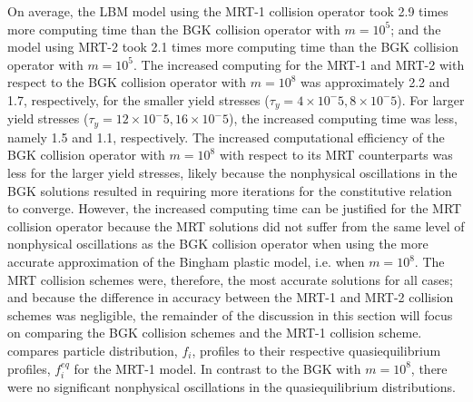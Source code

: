 On average, the LBM model using the MRT-1 collision operator took 2.9 times more computing time than the BGK collision operator with $m = 10^5$; and the model using MRT-2 took 2.1 times more computing time than the BGK collision operator with $m = 10^5$.
The increased computing for the MRT-1 and MRT-2 with respect to the BGK collision operator with $m = 10^8$ was approximately 2.2 and 1.7, respectively, for the smaller yield stresses ($\tau_y = 4 \times 10^-5, 8 \times 10^-5$).
For larger yield stresses ($\tau_y = 12 \times 10^-5, 16 \times 10^-5$), the increased computing time was less, namely 1.5 and 1.1, respectively.
The increased computational efficiency of the BGK collision operator with $m = 10^8$ with respect to its MRT counterparts was less for the larger yield stresses, likely because the nonphysical oscillations in the BGK solutions resulted in requiring more iterations for the constitutive relation to converge.
However, the increased computing time can be justified for the MRT collision operator because the MRT solutions did not suffer from the same level of nonphysical oscillations as the BGK collision operator when using the more accurate approximation of the Bingham plastic model, i.e. when $m = 10^8$. 
The MRT collision schemes were, therefore, the most accurate solutions for all cases; and because the difference in accuracy between the MRT-1 and MRT-2 collision schemes was negligible, the remainder of the discussion in this section will focus on comparing the BGK collision schemes and the MRT-1 collision scheme.
 compares particle distribution, $f_i$, profiles to their respective quasiequilibrium profiles, $f_i^{eq}$ for the MRT-1 model.
In contrast to the BGK with $m = 10^8$, there were no significant nonphysical oscillations in the quasiequilibrium distributions.

